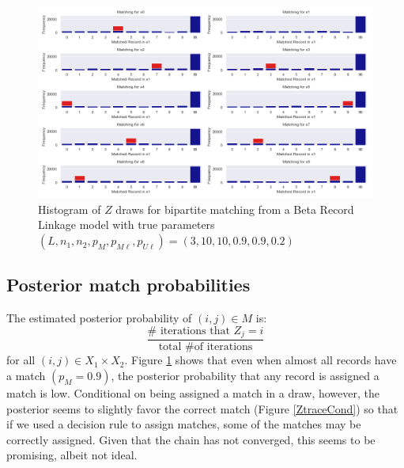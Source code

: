 \documentclass[11pt,reqno]{amsart}
\begin{document}
\begin{figure}[h!]
\begin{center}
\includegraphics[width=\textwidth]{../Figures/bpm/nM9/ZmatchesnM9_L3.png}
\caption{Histogram of $Z$ draws for bipartite matching from a Beta Record Linkage model with true parameters $(L, n_1, n_2, p_M, p_{M\ell}, p_{U\ell}) = (3, 10, 10, 0.9, 0.9, 0.2)$ }
\label{Ztrace}
\end{center}
\end{figure}

\subsection{Posterior match probabilities} 

The estimated posterior probability of $(i,j) \in M$ is:
$$ \frac{\# \text{ iterations that } Z_j = i}{\text{total \# of iterations}} $$
for all $(i,j)\in X_1\times X_2$.  Figure \ref{Ztrace} shows that even when almost all records have a match $(p_M = 0.9)$, the posterior probability that any record is assigned a match is low.  Conditional on being assigned a match in a draw, however, the posterior seems to slightly favor the correct match (Figure \ref{ZtraceCond}) so that if we used a decision rule to assign matches, some of the matches may be correctly assigned.  Given that the chain has not converged, this seems to be promising, albeit not ideal. 
\end{document}
